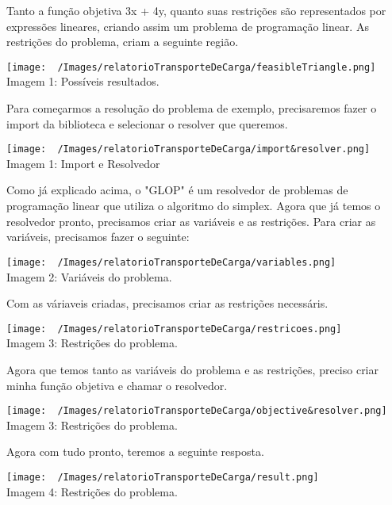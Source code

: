     Tanto a função objetiva 3x + 4y, quanto suas restrições são representados por expressões lineares, criando assim um problema de programação linear.  
    As restrições do problema, criam a seguinte região.

    \begin{center}
      \texttt{[image: ~/Images/relatorioTransporteDeCarga/feasibleTriangle.png]}\\
      Imagem 1: Possíveis resultados.
    \end{center}

    Para começarmos a resolução do problema de exemplo, precisaremos fazer o import da biblioteca e selecionar o resolver que queremos.
    \begin{center}
      \texttt{[image: ~/Images/relatorioTransporteDeCarga/import\&resolver.png]}\\
      Imagem 1: Import e Resolvedor
    \end{center}
    Como já explicado acima, o "GLOP" é um resolvedor de problemas de programação linear que utiliza o algoritmo do simplex.
    Agora que já temos o resolvedor pronto, precisamos criar as variáveis e as restrições. Para criar as variáveis, precisamos fazer o seguinte:
    \begin{center}
      \texttt{[image: ~/Images/relatorioTransporteDeCarga/variables.png]}\\
      Imagem 2: Variáveis do problema.
    \end{center}
    Com as váriaveis criadas, precisamos criar as restrições necessáris.
    \begin{center}
      \texttt{[image: ~/Images/relatorioTransporteDeCarga/restricoes.png]}\\
      Imagem 3: Restrições do problema.
    \end{center}
    Agora que temos tanto as variáveis do problema e as restrições, preciso criar minha função objetiva e chamar o resolvedor.
    \begin{center}
      \texttt{[image: ~/Images/relatorioTransporteDeCarga/objective\&resolver.png]}\\
      Imagem 3: Restrições do problema.
    \end{center}
    Agora com tudo pronto, teremos a seguinte resposta.
    \begin{center}
      \texttt{[image: ~/Images/relatorioTransporteDeCarga/result.png]}\\
      Imagem 4: Restrições do problema.
    \end{center}

